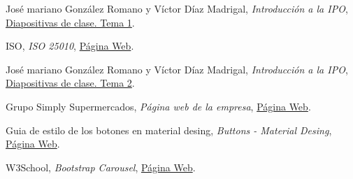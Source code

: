 \documentclass[a4paper,11pt]{article}
\begin{document}
\begin{thebibliography}{99}
  José mariano González Romano y Víctor Díaz Madrigal,
  \textit{Introducción a la IPO},
  \href{https://s3-eu-central-1.amazonaws.com/learn-eu-central-1-prod-fleet01-xythos/5ac734ed505df/1497177?response-content-disposition=inline%3B%20filename%2A%3DUTF-8%27%27IPO-2018-19-01-Introducci%25C3%25B3n%2520a%2520la%2520IPO.pdf&response-content-type=application%2Fpdf&X-Amz-Algorithm=AWS4-HMAC-SHA256&X-Amz-Date=20181009T201303Z&X-Amz-SignedHeaders=host&X-Amz-Expires=21600&X-Amz-Credential=AKIAIZ3QX2YUHH4EOO3A%2F20181009%2Feu-central-1%2Fs3%2Faws4_request&X-Amz-Signature=91e59768c9f86b77180953691bdcae19f7300073d4ad74d0949de1515d0b6f55}{Diapositivas de clase. Tema 1}.

ISO,
\textit{ISO 25010},
\href{https://iso25000.com/index.php/normas-iso-25000/iso-25010/23-usabilidad}{Página Web}.

José mariano González Romano y Víctor Díaz Madrigal,
\textit{Introducción a la IPO},
\href{https://s3-eu-central-1.amazonaws.com/learn-eu-central-1-prod-fleet01-xythos/5ac734ed505df/1548262?response-content-disposition=inline%3B%20filename%2A%3DUTF-8%27%27IPO-2018-19-02-Usabilidad.pdf&response-content-type=application%2Fpdf&X-Amz-Algorithm=AWS4-HMAC-SHA256&X-Amz-Date=20181009T201947Z&X-Amz-SignedHeaders=host&X-Amz-Expires=21600&X-Amz-Credential=AKIAIZ3QX2YUHH4EOO3A%2F20181009%2Feu-central-1%2Fs3%2Faws4_request&X-Amz-Signature=b0015ef5189a68a14076abd0ef07c9f15c07aa1ef5bebf8a545bf456bbfafe84}{Diapositivas de clase. Tema 2}.

Grupo Simply Supermercados,
\textit{Página web de la empresa},
\href{www.simply.es}{Página Web}.

Guia de estilo de los botones en material desing,
\textit{Buttons - Material Desing},
\href{https://material.io/design/components/buttons.html}{Página Web}.

W3School,
\textit{Bootstrap Carousel},
\href{https://www.w3schools.com/bootstrap/bootstrap_carousel.asp}{Página Web}.

\end{thebibliography}
\end{document}
